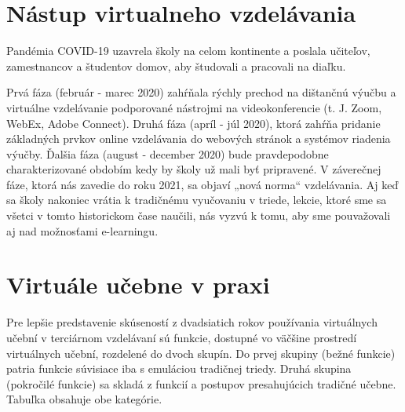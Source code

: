 \documentclass[10pt,twoside,slovak,a4paper]{article}
\begin{document}
\section{Nástup virtualneho vzdelávania}\label{covid}

Pandémia COVID-19 uzavrela školy na celom kontinente a poslala učiteľov, zamestnancov a študentov domov, aby študovali a pracovali na diaľku.

Prvá fáza (február - marec 2020) zahŕňala rýchly prechod na dištančnú výučbu a virtuálne vzdelávanie podporované nástrojmi na
videokonferencie (t. J. Zoom, WebEx, Adobe Connect). Druhá fáza (apríl - júl 2020),
ktorá zahŕňa pridanie základných prvkov online vzdelávania do webových stránok a systémov riadenia výučby.\cite{covid}
Ďalšia fáza (august - december 2020) bude pravdepodobne charakterizované obdobím kedy by školy už mali byť pripravené.
V záverečnej fáze, ktorá nás zavedie do roku 2021, sa objaví „nová norma“ vzdelávania. Aj keď sa školy nakoniec vrátia k
tradičnému vyučovaniu v triede, lekcie, ktoré sme sa všetci v tomto historickom čase naučili, nás vyzvú k tomu, aby sme pouvažovali 
aj nad možnosťami e-learningu.


\section{Virtuále učebne v praxi} \label{3}
Pre lepšie predstavenie skúseností z dvadsiatich rokov používania virtuálnych učební 
v terciárnom vzdelávaní sú funkcie, dostupné vo väčšine prostredí virtuálnych učební, rozdelené do 
dvoch skupín.\cite{VCf}  Do prvej skupiny (bežné funkcie) patria funkcie súvisiace iba s emuláciou tradičnej triedy. 
Druhá skupina (pokročilé funkcie) sa skladá z funkcií a postupov presahujúcich tradičné učebne.
Tabuľka obsahuje obe kategórie.
\end{document}
